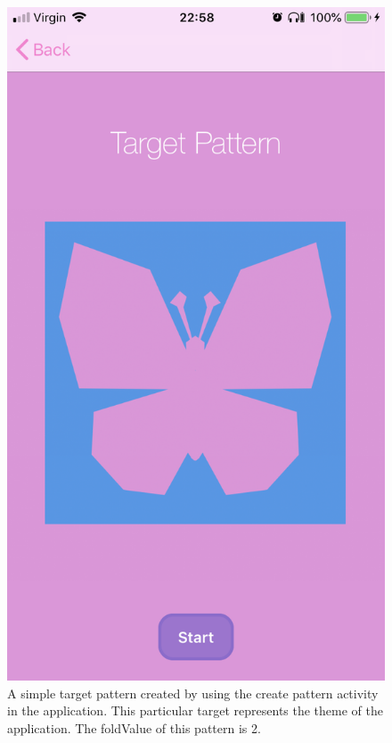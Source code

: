 \documentclass[11pt]{article}
\begin{document}
            \begin{figure}[!ht]
                        \begin{minipage}{0.45\textwidth}
                            \centering \includegraphics[width=0.7\linewidth]{KiriZen/simpleTarget}
                            \caption{A simple target pattern created by using the create pattern activity in the application. This particular target represents the theme of the application. The foldValue of this pattern is 2.\\}
                            \label{fig:kiriZen-simpleTarget}
                        \end{minipage}\hfill
                        \begin{minipage}{0.45\textwidth}
                            \centering

\end{minipage}
\end{figure}
\end{document}
